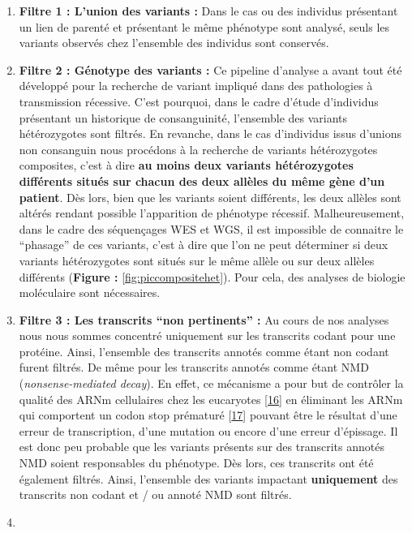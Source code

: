 \documentclass[12pt,twoside]{ugathesis}
\begin{document}
\begin{enumerate}
\def\labelenumi{\arabic{enumi}.}
\item
  \textbf{Filtre 1 : L'union des variants :} Dans le cas ou des
  individus présentant un lien de parenté et présentant le même
  phénotype sont analysé, seuls les variants observés chez l'ensemble
  des individus sont conservés.
\item
  \textbf{Filtre 2 : Génotype des variants :} Ce pipeline d'analyse a
  avant tout été développé pour la recherche de variant impliqué dans
  des pathologies à transmission récessive. C'est pourquoi, dans le
  cadre d'étude d'individus présentant un historique de consanguinité,
  l'ensemble des variants hétérozygotes sont filtrés. En revanche, dans
  le cas d'individus issus d'unions non consanguin nous procédons à la
  recherche de variants hétérozygotes composites, c'est à dire
  \textbf{au moins deux variants hétérozygotes différents situés sur
  chacun des deux allèles du même gène d'un patient}. Dès lors, bien que
  les variants soient différents, les deux allèles sont altérés rendant
  possible l'apparition de phénotype récessif. Malheureusement, dans le
  cadre des séquençages WES et WGS, il est impossible de connaitre le
  ``phasage'' de ces variants, c'est à dire que l'on ne peut déterminer
  si deux variants hétérozygotes sont situés sur le même allèle ou sur
  deux allèles différents (\textbf{Figure : }\ref{fig:piccompositehet}).
  Pour cela, des analyses de biologie moléculaire sont nécessaires.
\item
  \textbf{Filtre 3 : Les transcrits ``non pertinents'' :} Au cours de
  nos analyses nous nous sommes concentré uniquement sur les transcrits
  codant pour une protéine. Ainsi, l'ensemble des transcrits annotés
  comme étant non codant furent filtrés. De même pour les transcrits
  annotés comme étant NMD (\emph{nonsense-mediated decay}). En effet, ce
  mécanisme a pour but de contrôler la qualité des ARNm cellulaires chez
  les eucaryotes {[}\protect\hyperlink{ref-Chang2007}{16}{]} en
  éliminant les ARNm qui comportent un codon stop prématuré
  {[}\protect\hyperlink{ref-Baker2004}{17}{]} pouvant être le résultat
  d'une erreur de transcription, d'une mutation ou encore d'une erreur
  d'épissage. Il est donc peu probable que les variants présents sur des
  transcrits annotés NMD soient responsables du phénotype. Dès lors, ces
  transcrits ont été également filtrés. Ainsi, l'ensemble des variants
  impactant \textbf{uniquement} des transcrits non codant et / ou annoté
  NMD sont filtrés.
\item

\end{enumerate}
\end{document}
